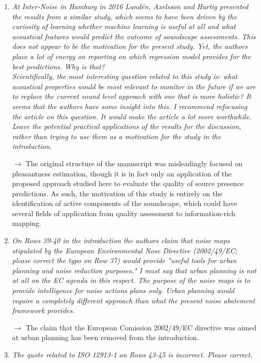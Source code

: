 \documentclass[10pt]{article}
\begin{document}
\begin{enumerate}
\item \emph{At Inter-Noise in Hamburg in 2016 Lund\'en, Axelsson and Hurtig presented the results from a similar study, which seems to have been driven by the curiosity of learning whether machine learning is useful at all and what acoustical features would predict the outcome of soundscape assessments. This does not appear to be the motivation for the present study. Yet, the authors place a lot of energy on reporting on which regression model provides for the best predictions. Why is that?\\
Scientifically, the most interesting question related to this study is: what acoustical properties would be most relevant to monitor in the future if we are to replace the current sound level approach with one that is more holistic? It seems that the authors have some insight into this. I recommend refocusing the article on this question. It would make the article a lot more worthwhile. Leave the potential practical applications of the results for the discussion, rather than trying to use them as a motivation for the study in the introduction.}

$\rightarrow$ The original structure of the manuscript was misleadingly focused on pleasantness estimation, though it is in fact only an application of the proposed approach studied here to evaluate the quality of source presence predictions. As such, the motivation of this study is entirely on the identification of active components of the soundscape, which could have several fields of application from quality assessment to information-rich mapping. 

\item \emph{On Rows 39-40 in the introduction the authors claim that noise maps stipulated by the European Environmental Nose Directive (2002/49/EC; please correct the typo on Row 37) would provide "useful tools for urban planning and noise reduction purposes." I must say that urban planning is not at all on the EC agenda in this respect. The purpose of the noise maps is to provide intelligence for noise actions plans only. Urban planning would require a completely different approach than what the present noise abatement framework provides.}

$\rightarrow$ The claim that the European Comission 2002/49/EC directive was aimed at urban planning has been removed from the introduction.

\item \emph{The quote related to ISO 12913-1 on Rows 43-45 is incorrect. Please correct.}


\end{enumerate}
\end{document}
